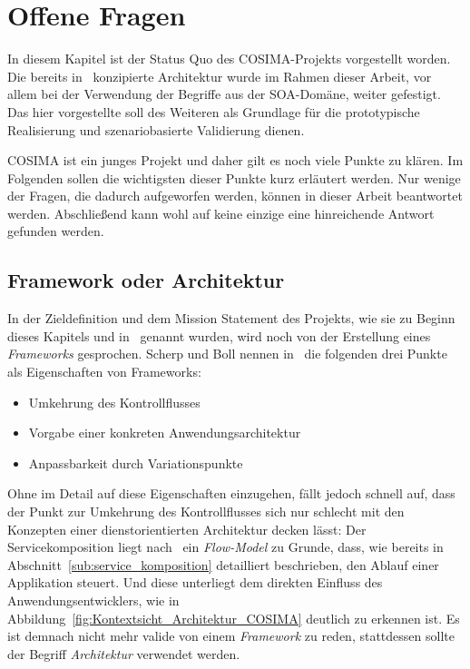 


\section{Offene Fragen} %
\label{sec:offene_fragen}

  In diesem Kapitel ist der Status Quo des COSIMA-Projekts vorgestellt worden. Die bereits in~\citep{bericht} konzipierte Architektur wurde im Rahmen dieser Arbeit, vor allem bei der Verwendung der Begriffe aus der SOA-Domäne, weiter gefestigt. Das hier vorgestellte soll des Weiteren als Grundlage für die prototypische Realisierung und szenariobasierte Validierung dienen.

  COSIMA ist ein junges Projekt und daher gilt es noch viele Punkte zu klären. Im Folgenden sollen die wichtigsten dieser Punkte kurz erläutert werden. Nur wenige der Fragen, die dadurch aufgeworfen werden, können in dieser Arbeit beantwortet werden. Abschließend kann wohl auf keine einzige eine hinreichende Antwort gefunden werden.
  
\subsection{Framework oder Architektur} %
\label{sub:framework_oder_architektur}

  In der Zieldefinition und dem Mission Statement des Projekts, wie sie zu Beginn dieses Kapitels und in~\citep{bericht} genannt wurden, wird noch von der Erstellung eines \emph{Frameworks} gesprochen. Scherp und Boll nennen in~\citep[S. 396f]{scherp2006fe} die folgenden drei Punkte als Eigenschaften von Frameworks:
  
  \begin{itemize}
    \item Umkehrung des Kontrollflusses
    \item Vorgabe einer konkreten Anwendungsarchitektur
    \item Anpassbarkeit durch Variationspunkte
  \end{itemize}
  
  Ohne im Detail auf diese Eigenschaften einzugehen, fällt jedoch schnell auf, dass der Punkt zur Umkehrung des Kontrollflusses sich nur schlecht mit den Konzepten einer dienstorientierten Architektur decken lässt: Der Servicekomposition liegt nach~\citep[S. 320]{web_services_principles_and_technology} ein \emph{Flow-Model} zu Grunde, dass, wie bereits in Abschnitt~\ref{sub:service_komposition} detailliert beschrieben, den Ablauf einer Applikation steuert. Und diese unterliegt dem direkten Einfluss des Anwendungsentwicklers, wie in Abbildung~\ref{fig:Kontextsicht_Architektur_COSIMA} deutlich zu erkennen ist. Es ist demnach nicht mehr valide von einem \emph{Framework} zu reden, stattdessen sollte der Begriff \emph{Architektur} verwendet werden.


